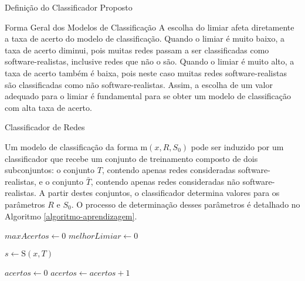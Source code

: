 \begin{section}{Definição do Classificador Proposto}
\begin{subsection}{Forma Geral dos Modelos de Classificação}
	A escolha do limiar afeta diretamente a taxa de acerto do modelo de classificação. Quando o limiar é muito baixo, a taxa de acerto diminui, pois muitas redes passam a ser classificadas como software-realistas, inclusive redes que não o são. Quando o limiar é muito alto, a taxa de acerto também é baixa, pois neste caso muitas redes software-realistas são classificadas como não software-realistas. Assim, a escolha de um valor adequado para o limiar é fundamental para se obter um modelo de classificação com alta taxa de acerto.

\end{subsection}

\begin{subsection}{Classificador de Redes}

	Um modelo de classificação da forma $\mathrm{m}(x, R, S_0)$ pode ser induzido por um classificador que recebe um conjunto de treinamento composto de dois subconjuntos: o conjunto $T$, contendo apenas redes consideradas software-realistas, e o conjunto $\bar{T}$, contendo apenas redes consideradas não software-realistas. A partir destes conjuntos, o classificador determina valores para os parâmetros $R$ e $S_0$. O processo de determinação desses parâmetros é detalhado no Algoritmo \ref{algoritmo-aprendizagem}.
	

	
\begin{algorithm}
\caption{Algoritmo que Determina os Parâmetros $R$ e $S_0$ de um Modelo de Classificação a Partir dos Conjuntos $T$ e $\bar{T}$} \label{algoritmo-aprendizagem}
\begin{algorithmic}
\STATE $maxAcertos \gets 0$
\STATE $melhorLimiar \gets 0$

	\STATE $s \gets \mathrm{S}(x, T)$
	
	\STATE $acertos \gets 0$
			\STATE $acertos \gets acertos + 1$
		\ENDIF
	\ENDFOR
	

\end{algorithmic}
\end{algorithm}
\end{subsection}
\end{section}
